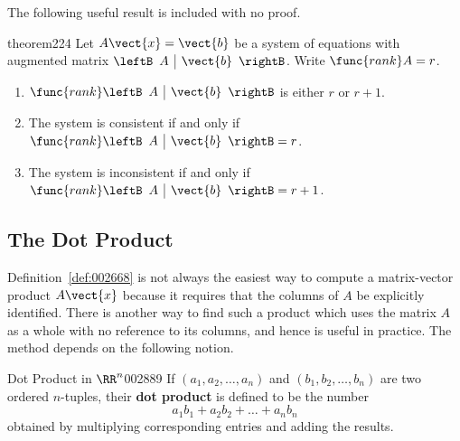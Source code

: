 The following useful result is included with no proof.

\begin{theorem}{}{theorem224}
Let $A\vect{x} = \vect{b}$ be a system of equations with augmented matrix $\leftB \begin{array}{c|c} A & \vect{b}
\end{array}\rightB$. Write $\func{rank} A = r$. 
\begin{enumerate}
\item $\func{rank} \leftB \begin{array}{c|c} A & \vect{b}
\end{array}\rightB$ is either $r$ or $r+1$.
\item The system is consistent if and only if $\func{rank} \leftB \begin{array}{c|c} A & \vect{b}
\end{array}\rightB = r$.
\item The system is inconsistent if and only if $\func{rank} \leftB \begin{array}{c|c} A & \vect{b}
\end{array}\rightB = r+1$.
\end{enumerate}
\end{theorem}

\subsection*{The Dot Product}


Definition~\ref{def:002668} is not always the easiest way to compute a matrix-vector product $A\vect{x}$ because it requires that the columns of $A$ be explicitly identified. There is another way to find such a product which uses the matrix $A$ as a whole with no reference to its columns, and hence is useful in practice. The method depends on the following notion.


\begin{definition}{Dot Product in $\RR^n$}{002889}
If $(a_{1}, a_{2}, \dots, a_{n})$ and $(b_{1}, b_{2}, \dots, b_{n})$ are two ordered $n$-tuples, their \textbf{dot product} is defined to be the number
\begin{equation*}
a_{1}b_{1} + a_{2}b_{2} + \dots + a_{n}b_{n}
\end{equation*}
obtained by multiplying corresponding entries and adding the results.
\end{definition}

